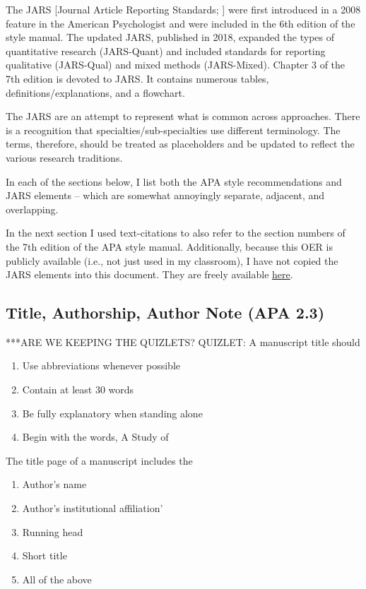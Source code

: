 \documentclass[
  11pt,
]{book}
\providecommand{\tightlist}{%
  \setlength{\itemsep}{0pt}\setlength{\parskip}{0pt}}
\begin{document}
The JARS {[}Journal Article Reporting Standards; \citet{appelbaum_journal_2018}{]} were first introduced in a 2008 feature in the American Psychologist \citep{noauthor_reporting_2008} and were included in the 6th edition of the style manual. The updated JARS, published in 2018, expanded the types of quantitative research (JARS-Quant) and included standards for reporting qualitative (JARS-Qual) and mixed methods (JARS-Mixed). Chapter 3 of the 7th edition is devoted to JARS. It contains numerous tables, definitions/explanations, and a flowchart.

The JARS are an attempt to represent what is common across approaches. There is a recognition that specialties/sub-specialties use different terminology. The terms, therefore, should be treated as placeholders and be updated to reflect the various research traditions.

In each of the sections below, I list both the APA style recommendations and JARS elements -- which are somewhat annoyingly separate, adjacent, and overlapping.

In the next section I used text-citations to also refer to the section numbers of the 7th edition of the APA style manual. Additionally, because this OER is publicly available (i.e., not just used in my classroom), I have not copied the JARS elements into this document. They are freely available \href{https://apastyle.apa.org/jars/quantitative}{here}.

\hypertarget{title-authorship-author-note-apa-2.3}{%
\subsection{Title, Authorship, Author Note (APA 2.3)}\label{title-authorship-author-note-apa-2.3}}

***ARE WE KEEPING THE QUIZLETS? QUIZLET:
A manuscript title should

\begin{enumerate}
\def\labelenumi{\alph{enumi}.}
\tightlist
\item
  Use abbreviations whenever possible
\item
  Contain at least 30 words
\item
  Be fully explanatory when standing alone
\item
  Begin with the words, A Study of
\end{enumerate}

The title page of a manuscript includes the

\begin{enumerate}
\def\labelenumi{\alph{enumi}.}
\tightlist
\item
  Author's name
\item
  Author's institutional affiliation'
\item
  Running head
\item
  Short title
\item
  All of the above
\end{enumerate}
\end{document}
